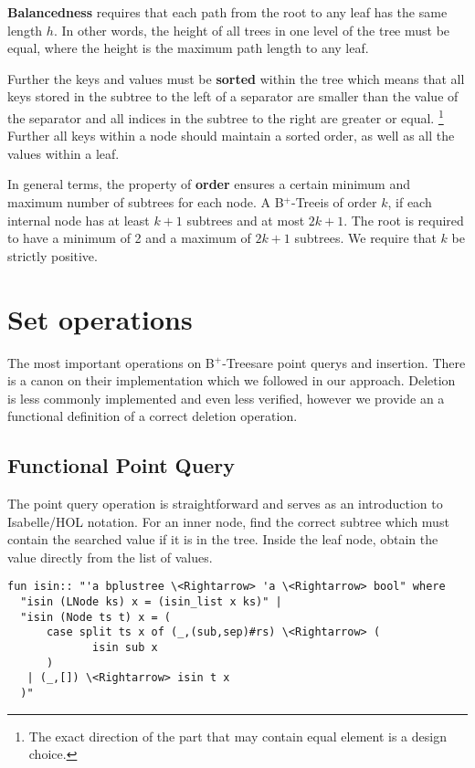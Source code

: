 \documentclass[a4paper,UKenglish,cleveref, autoref, thm-restate]{lipics-v2021}
\newcommand{\btree}{B$^+$-Tree}
\newcommand{\btrees}{B$^+$-Trees}
\begin{document}
\textbf{Balancedness} requires
that each path from the root to any leaf has the same length $h$.
In other words, the height of all trees in one level of the tree must be equal,
where the height is the maximum path length to any leaf.

Further the keys and values must be \textbf{sorted} within the tree which means that all keys stored
in the subtree to the left of a separator are smaller than the value of the separator
and all indices in the subtree to the right are greater or equal.
\footnote{
    The exact direction of the part that may contain equal element is a design choice.
}
Further all keys within a node should maintain a sorted order,
as well as all the values within a leaf.

In general terms, the property of \textbf{order} ensures a certain minimum and maximum
number of subtrees for each node.
A \btree is of order $k$, if each internal node has at least $k+1$
subtrees and at most $2k+1$.
The root is required to have a minimum of 2 and a maximum of $2k+1$ subtrees.
We require that $k$ be strictly positive.

\section{Set operations}
\label{sec:set}

The most important operations on \btrees are point querys and insertion.
There is a canon on their implementation which we followed in our approach.
Deletion is less commonly implemented and even less verified,
however we provide an a functional definition of a correct deletion operation.

\subsection{Functional Point Query}
\label{sec:functional_pq}

The point query operation is straightforward and serves as an introduction
to Isabelle/HOL notation.
For an inner node, find the correct subtree which must contain
the searched value if it is in the tree.
Inside the leaf node, obtain the value directly from the list of values.

\begin{lstlisting}[mathescape=true, language=Isabelle,label=lst:isin-def]
fun isin:: "'a bplustree \<Rightarrow> 'a \<Rightarrow> bool" where
  "isin (LNode ks) x = (isin_list x ks)" |
  "isin (Node ts t) x = (
      case split ts x of (_,(sub,sep)#rs) \<Rightarrow> (
             isin sub x
      )
   | (_,[]) \<Rightarrow> isin t x
  )"
\end{lstlisting}
\end{document}
